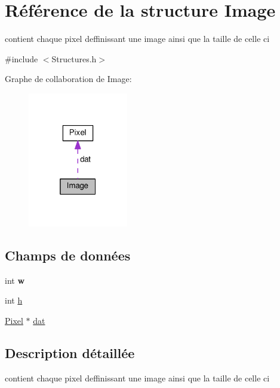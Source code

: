 \hypertarget{structImage}{}\section{Référence de la structure Image}
\label{structImage}


contient chaque pixel deffinissant une image ainsi que la taille de celle ci  




{\ttfamily \#include $<$Structures.\+h$>$}



Graphe de collaboration de Image\+:\nopagebreak
\begin{figure}[H]
\begin{center}
\leavevmode
\includegraphics[width=124pt]{structImage__coll__graph}
\end{center}
\end{figure}
\subsection*{Champs de données}
\begin{DoxyCompactItemize}
\item 
int {\bfseries w}\hypertarget{structImage_a5a1c5528c889b0438bc2dc0c0ee94dbe}{}\label{structImage_a5a1c5528c889b0438bc2dc0c0ee94dbe}

\item 
int \hyperlink{structImage_aead13dbc461159381773fff06824e651}{h}
\item 
\hyperlink{structPixel}{Pixel} $\ast$ \hyperlink{structImage_abc032a260e391b03f825917716eb07b7}{dat}
\end{DoxyCompactItemize}


\subsection{Description détaillée}
contient chaque pixel deffinissant une image ainsi que la taille de celle ci 


